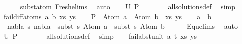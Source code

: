 \begin{isabellebody}
\ \ \ \ \isamarkupfalse%
\ subst{\isacharunderscore}{\kern0pt}atom\ Fresh{\isacharunderscore}{\kern0pt}elims{\isacharparenleft}{\kern0pt}{}{\isacharparenright}{\kern0pt}\ \isamarkupfalse%
\ auto\isanewline
\ \ \isamarkupfalse%
\ {\isachardoublequoteopen}U\ {\isacharquery}{\kern0pt}P\ {\isacharequal}{\kern0pt}\ {\isacharbraceleft}{\kern0pt}{\isacharbraceright}{\kern0pt}{\isachardoublequoteclose}\isanewline
\ \ \ \ \isamarkupfalse%
\ all{\isacharunderscore}{\kern0pt}solutions{\isacharunderscore}{\kern0pt}def\ \isamarkupfalse%
\ simp\isanewline
{}\isamarkupfalse%
\isanewline
\ \ \isamarkupfalse%
\ {\isacharparenleft}{\kern0pt}fail{\isacharunderscore}{\kern0pt}diff{\isacharunderscore}{\kern0pt}atoms\ a\ b\ xs\ ys{\isacharparenright}{\kern0pt}\isanewline
\ \ \isamarkupfalse%
\ {\isacharquery}{\kern0pt}P\ {\isacharequal}{\kern0pt}\ {\isachardoublequoteopen}{\isacharparenleft}{\kern0pt}Atom\ a\ {\isasymapprox}{\isacharquery}{\kern0pt}\ Atom\ b\ {\isacharhash}{\kern0pt}\ xs{\isacharcomma}{\kern0pt}\ ys{\isacharparenright}{\kern0pt}{\isachardoublequoteclose}\isanewline
\ \ \isamarkupfalse%
\ {\isacartoucheopen}a\ {\isasymnoteq}\ b{\isacartoucheclose}\ \isamarkupfalse%
\ {\isachardoublequoteopen}{\isasymnexists}\ nabla\ s{\isachardot}{\kern0pt}\ nabla\ {\isasymturnstile}\ subst\ s\ {\isacharparenleft}{\kern0pt}Atom\ a{\isacharparenright}{\kern0pt}\ {\isasymapprox}\ subst\ s\ {\isacharparenleft}{\kern0pt}Atom\ b{\isacharparenright}{\kern0pt}{\isachardoublequoteclose}\isanewline
\ \ \ \ \isamarkupfalse%
\ Equ{\isacharunderscore}{\kern0pt}elims{\isacharparenleft}{\kern0pt}{}{\isacharparenright}{\kern0pt}\ \isamarkupfalse%
\ auto\isanewline
\ \ \isamarkupfalse%
\ {\isachardoublequoteopen}U\ {\isacharquery}{\kern0pt}P\ {\isacharequal}{\kern0pt}\ {\isacharbraceleft}{\kern0pt}{\isacharbraceright}{\kern0pt}{\isachardoublequoteclose}\isanewline
\ \ \ \ \isamarkupfalse%
\ all{\isacharunderscore}{\kern0pt}solutions{\isacharunderscore}{\kern0pt}def\ \isamarkupfalse%
\ simp\isanewline
{}\isamarkupfalse%
\isanewline
\ \ \isamarkupfalse%
\ {\isacharparenleft}{\kern0pt}fail{\isacharunderscore}{\kern0pt}abst{\isacharunderscore}{\kern0pt}unit\ a\ t\ xs\ ys{\isacharparenright}{\kern0pt}\isanewline
\ \ \isamarkupfalse%

\end{isabellebody}
